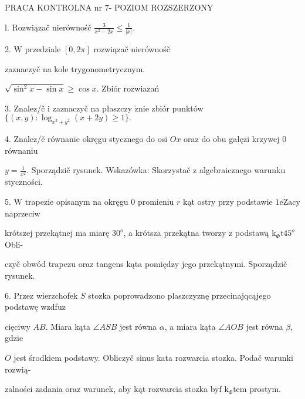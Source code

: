 \documentclass[a4paper,12pt]{article}
\begin{document}
PRACA KONTROLNA nr 7- POZIOM ROZSZERZONY

l. Rozwiązač nierównośč $\displaystyle \frac{3}{x^{2}-2x}\leq\frac{1}{|x|}.$

2. $\mathrm{W}$ przedziale $[0,2\pi]$ rozwiązač nierównośč

zaznaczyč na kole trygonometrycznym.

$\sqrt{\sin^{2}x-\sin x} \geq \cos x$. Zbiór rozwiazań

3. Znalez/č $\mathrm{i}$ zaznaczyč na płaszczy $\acute{\mathrm{z}}\mathrm{n}\mathrm{i}\mathrm{e}$ zbiór punktów $\{(x,y):\log_{x^{2}+y^{2}}(x+2y)\geq 1\}.$

4. Znalez/č równanie okręgu stycznego do osi $Ox$ oraz do obu gałęzi krzywej $0$ równaniu

$y=\displaystyle \frac{1}{x^{2}}$. Sporządzič rysunek. Wskazówka: Skorzystač $\mathrm{z}$ algebraicznego warunku styczności.

5. $\mathrm{W}$ trapezie opisanym na okręgu $0$ promieniu $r$ kąt ostry przy podstawie $1\mathrm{e}\dot{\mathrm{Z}}\mathrm{a}\mathrm{c}\mathrm{y}$ naprzeciw

krótszej przekątnej ma miarę $30^{o}$, a krótsza przekątna tworzy $\mathrm{z}$ podstawą $\mathrm{k}_{\Phi}\mathrm{t}45^{o}$ Obli-

czyč obwód trapezu oraz tangens kąta pomiędzy jego przekątnymi. Sporządzič rysunek.

6. Przez wierzchofek $S$ stozka poprowadzono plaszczyznę przecinajqcąjego podstawę wzdfuz

cięciwy $AB$. Miara kąta $\angle ASB$ jest równa $\alpha$, a miara kąta $\angle AOB$ jest równa $\beta$, gdzie

$O$ jest środkiem podstawy. Obliczyč sinus kata rozwarcia stozka. Podač warunki rozwią-

zalności zadania oraz warunek, aby kąt rozwarcia stozka byf $\mathrm{k}_{\Phi}\mathrm{t}\mathrm{e}\mathrm{m}$ prostym.
\end{document}
